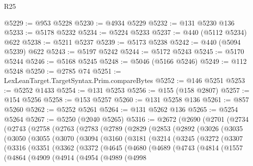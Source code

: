 \begin{lexlean}{R25}
\begin{coremodule}
@5229 := @953 @5228
@5230 := @4934 @5229
@5232 := @131 @5230 @136
@5233 := @5178 @5232
@5234 := @5224 @5233
@5237 := @440 (@5112 @5234) @622
@5238 := @5211 @5237
@5239 := @5173 @5238
@5242 := @440 (@5094 @5239) @622
@5243 := @5197 @5242
@5244 := @5172 @5243
@5245 := @5170 @5244
@5246 := @5168 @5245
@5248 := @5046 (@5166 @5246)
@5249 := @112 @5248
@5250 := @2785 @74
@5251 := LexLeanTarget.TargetSyntax.Prim.compareBytes
@5252 := @146 @5251
@5253 := @5252 @1433
@5254 := @131 @5253
@5256 := @155 (@158 @2807)
@5257 := @154 @5256
@5258 := @153 @5257
@5260 := @131 @5258 @136
@5261 := @857 @5260
@5262 := @5252 @5261
@5264 := @131 @5262 @136
@5265 := @5254 @5264
@5267 := @5250 (@2040 @5265)
@5316 := @2672
    (@2690
      (@2701
        (@2734
          (@2743
            (@2758
              (@2763
                (@2783
                  (@2789
                    (@2829
                      (@2853
                        (@2892
                          (@3026
                            (@3035
                              (@3050
                                (@3055
                                  (@3070
                                    (@3094
                                      (@3160
                                        (@3181
                                          (@3214
                                            (@3245
                                              (@3272
                                                (@3307
                                                  (@3316
                                                    (@3351
                                                      (@3362
                                                        (@3372
                                                          (@4645
                                                            (@4680
                                                              (@4689
                                                                (@4743
                                                                  (@4814
                                                                    (@1557
                                                                      (@4864
                                                                        (@4909
                                                                          (@4914
                                                                            (@4954
                                                                              (@4989
                                                                                (@4998

\end{coremodule}
\end{lexlean}
